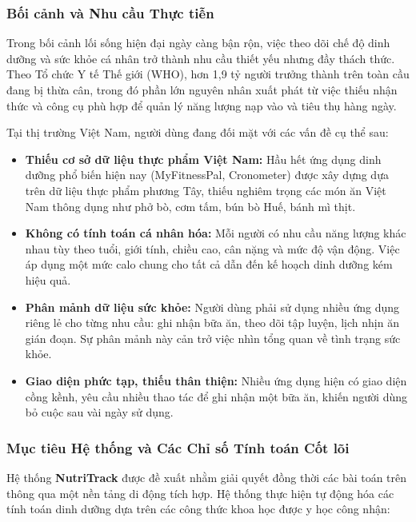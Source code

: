 \documentclass[12pt,a4paper]{article}
\begin{document}
\subsubsection{Bối cảnh và Nhu cầu Thực tiễn}

Trong bối cảnh lối sống hiện đại ngày càng bận rộn, việc theo dõi chế độ dinh dưỡng và sức khỏe cá nhân trở thành nhu cầu thiết yếu nhưng đầy thách thức. Theo Tổ chức Y tế Thế giới (WHO), hơn 1,9 tỷ người trưởng thành trên toàn cầu đang bị thừa cân, trong đó phần lớn nguyên nhân xuất phát từ việc thiếu nhận thức và công cụ phù hợp để quản lý năng lượng nạp vào và tiêu thụ hàng ngày.

Tại thị trường Việt Nam, người dùng đang đối mặt với các vấn đề cụ thể sau:

\begin{itemize}
    \item \textbf{Thiếu cơ sở dữ liệu thực phẩm Việt Nam:} Hầu hết ứng dụng dinh dưỡng phổ biến hiện nay (MyFitnessPal, Cronometer) được xây dựng dựa trên dữ liệu thực phẩm phương Tây, thiếu nghiêm trọng các món ăn Việt Nam thông dụng như phở bò, cơm tấm, bún bò Huế, bánh mì thịt.
    
    \item \textbf{Không có tính toán cá nhân hóa:} Mỗi người có nhu cầu năng lượng khác nhau tùy theo tuổi, giới tính, chiều cao, cân nặng và mức độ vận động. Việc áp dụng một mức calo chung cho tất cả dẫn đến kế hoạch dinh dưỡng kém hiệu quả.
    
    \item \textbf{Phân mảnh dữ liệu sức khỏe:} Người dùng phải sử dụng nhiều ứng dụng riêng lẻ cho từng nhu cầu: ghi nhận bữa ăn, theo dõi tập luyện, lịch nhịn ăn gián đoạn. Sự phân mảnh này cản trở việc nhìn tổng quan về tình trạng sức khỏe.
    
    \item \textbf{Giao diện phức tạp, thiếu thân thiện:} Nhiều ứng dụng hiện có giao diện cồng kềnh, yêu cầu nhiều thao tác để ghi nhận một bữa ăn, khiến người dùng bỏ cuộc sau vài ngày sử dụng.
\end{itemize}

\subsubsection{Mục tiêu Hệ thống và Các Chỉ số Tính toán Cốt lõi}

Hệ thống \textbf{NutriTrack} được đề xuất nhằm giải quyết đồng thời các bài toán trên thông qua một nền tảng di động tích hợp. Hệ thống thực hiện tự động hóa các tính toán dinh dưỡng dựa trên các công thức khoa học được y học công nhận:
\end{document}
